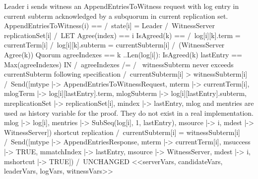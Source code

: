 \documentclass{standalone}
\begin{document}
\onehalfspacing

    \begin{tla}

\* Leader i sends witness an AppendEntriesToWitness request with log entry 
\* in current subterm acknowledged by a subquorum in current replication set.
AppendEntriesToWitness(i) ==
    /\ state[i] = Leader
    /\ WitnessServer \in replicationSet[i]
    /\ LET Agree(index) == 
               {i} 
           IsAgreed(k)  ==
               /\ log[i][k].term    = currentTerm[i]
               /\ log[i][k].subterm = currentSubterm[i]
               /\ ({WitnessServer} \cup Agree(k)) \in Quorum
           agreeIndexes == { k ..Len(log[i]): IsAgreed(k) }
           lastEntry    == Max(agreeIndexes)
       IN /\ agreeIndexes /= {}
          /\ \/ \* witnessSubterm never exceeds currentSubterm following specification
                /\ currentSubterm[i] > witnessSubterm[i]
                /\ Send([mtype           |-> AppendEntriesToWitnessRequest,
                         mterm           |-> currentTerm[i],
                         mlogTerm        |-> log[i][lastEntry].term,
                         mlogSubterm     |-> log[i][lastEntry].subterm,
                         mreplicationSet |-> replicationSet[i],
                         mindex          |-> lastEntry,
                         \* mlog and mentries are used as history variable for
                         \* the proof. They do not exist in a real implementation.
                         mlog            |-> log[i],
                         mentries        |-> SubSeq(log[i], 1, lastEntry),
                         msource         |-> i,
                         mdest           |-> WitnessServer])
             \/ \* shortcut replication
                /\ currentSubterm[i] = witnessSubterm[i]
                /\ Send([mtype           |-> AppendEntriesResponse,
                         mterm           |-> currentTerm[i],
                         msuccess        |-> TRUE,
                         mmatchIndex     |-> lastEntry,
                         msource         |-> WitnessServer,
                         mdest           |-> i,
                         mshortcut       |-> TRUE])
    /\ UNCHANGED <<serverVars, candidateVars, leaderVars, logVars, witnessVars>>
      
      
    \end{tla}
\end{document}
